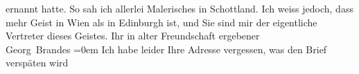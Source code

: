 \begin{ledgroupsized}[t]{13cm}
               ernannt hatte. So sah ich allerlei Malerisches in Schottland.\pend
           \pstart
           Ich weiss jedoch, dass mehr Geist in Wien als in
                  Edinburgh ist, und Sie sind mir der
               eigentliche Vertreter dieses Geistes.\pend
           \pstart
           Ihr in alter Freundschaft ergebener{\\[\baselineskip]}\spacefill\mbox{Georg Brandes}\pend
           \leftskip=0em{}\pstart
           \noindent{}Ich habe leider Ihre Adresse vergessen, was den Brief verspäten wird\pend
           
         
         \endnumbering{}\end{ledgroupsized}  \newcommand{\dateiname}{L02033}\newcommand{\titel}{Georg Brandes an Arthur Schnitzler, 6. 10. 1911}\newcommand{\editorInnen}{Martin Anton Müller und Gerd-Hermann Susen}
      